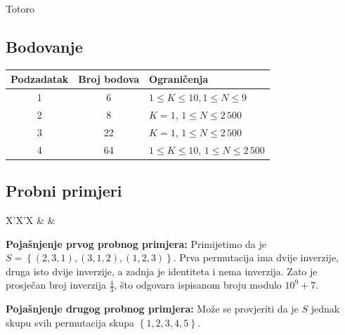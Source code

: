 \begin{statement}[
  problempoints=100,
  timelimit=1 sekunda,
  memorylimit=512 MiB,
]{Totoro}
\subsection*{Bodovanje}
{\renewcommand{\arraystretch}{1.4}
  \setlength{\tabcolsep}{6pt}
  \begin{tabular}{ccl}
 Podzadatak & Broj bodova & Ograničenja \\ \midrule
  1 & 6 & $ 1 \le K \le 10, 1 \le N \le 9$ \\
  2 & 8 & $ K = 1 $, $1 \le N \le 2\,500$ \\
  3 & 22 & $ K = 1$, $1 \le N \le 2\,500$ \\
  4 & 64 & $1 \le K \le 10$, $1 \le N \le 2\,500$ \\
\end{tabular}}

\subsection*{Probni primjeri}
\begin{tabularx}{\textwidth}{X'X'X}
 &
 &
\end{tabularx}

\textbf{Pojašnjenje prvog probnog primjera:}
Primijetimo da je $S = \left\{ (2, 3, 1), (3, 1, 2), (1, 2, 3)\right\}$.
Prva permutacija ima dvije inverzije, druga isto dvije inverzije, a zadnja
je identiteta i nema inverzija. Zato je prosječan broj inverzija $\frac{4}{3}$,
što odgovara ispisanom broju modulo $10^9 + 7$.

\textbf{Pojašnjenje drugog probnog primjera:}
Može se provjeriti da je $S$ jednak skupu svih permutacija skupa 
$\left\{1, 2, 3, 4, 5 \right\}$. 

\end{statement}

